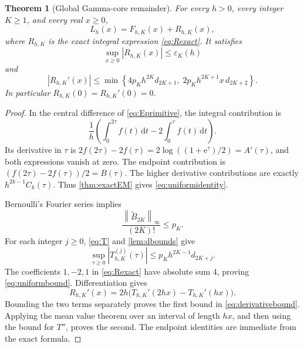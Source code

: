 \documentclass[11pt,a4paper]{article}
\numberwithin{equation}{section}
\newtheorem{theorem}{Theorem}[section]
\theoremstyle{definition}
\newcommand{\ee}{\mathrm e}
\newcommand{\dd}{\,\mathrm d}
\newcommand{\norm}[1]{\left\lVert#1\right\rVert}
\newcommand{\bB}{\widetilde B}
\newcommand{\eps}{\varepsilon}
\begin{document}
\begin{theorem}[Global Gamma-core remainder]
\label{thm:uniform}
For every $h>0$, every integer $K\ge1$, and every real $x\ge0$,
\begin{equation}
L_h(x)=F_{h,K}(x)+R_{h,K}(x),
\label{eq:uniformidentity}
\end{equation}
where $R_{h,K}$ is the exact integral expression \eqref{eq:Rexact}. It satisfies
\begin{equation}
\sup_{x\ge0}|R_{h,K}(x)|\le\eps_K(h)
\label{eq:uniformbound}
\end{equation}
and
\begin{equation}
|R_{h,K}'(x)|\le
\min\left\{4p_Kh^{2K}d_{2K+1},\;
           2p_Kh^{2K+1}x\,d_{2K+2}\right\}.
\label{eq:derivativebound}
\end{equation}
In particular $R_{h,K}(0)=R_{h,K}'(0)=0$.
\end{theorem}
\begin{proof}
In the central difference of \eqref{eq:Eprimitive}, the integral contribution is
\[
\frac1h\left(\int_0^{2\tau}f(t)\dd t
                           -2\int_0^\tau f(t)\dd t\right).
\]
Its derivative in $\tau$ is $2f(2\tau)-2f(\tau)=2\log((1+\ee^\tau)/2)=A'(\tau)$, and both expressions vanish at zero. The endpoint contribution is $(f(2\tau)-2f(\tau))/2=B(\tau)$. The higher derivative contributions are exactly $h^{2k-1}C_k(\tau)$. Thus \cref{thm:exactEM} gives \eqref{eq:uniformidentity}.

Bernoulli's Fourier series implies
\[
\frac{\norm{\bB_{2K}}_\infty}{(2K)!}\le p_K.
\]
For each integer $j\ge0$, \eqref{eq:T} and \cref{lem:dbounds} give
\begin{equation}
\sup_{\tau\ge0}|T_{h,K}^{(j)}(\tau)|
 \le p_Kh^{2K-1}d_{2K+j}.
\label{eq:Tbounds}
\end{equation}
The coefficients $1,-2,1$ in \eqref{eq:Rexact} have absolute sum $4$, proving \eqref{eq:uniformbound}. Differentiation gives
\[
R_{h,K}'(x)=2h\bigl(T_{h,K}'(2hx)-T_{h,K}'(hx)\bigr).
\]
Bounding the two terms separately proves the first bound in \eqref{eq:derivativebound}. Applying the mean value theorem over an interval of length $hx$, and then using the bound for $T''$, proves the second. The endpoint identities are immediate from the exact formula.
\end{proof}
\end{document}

